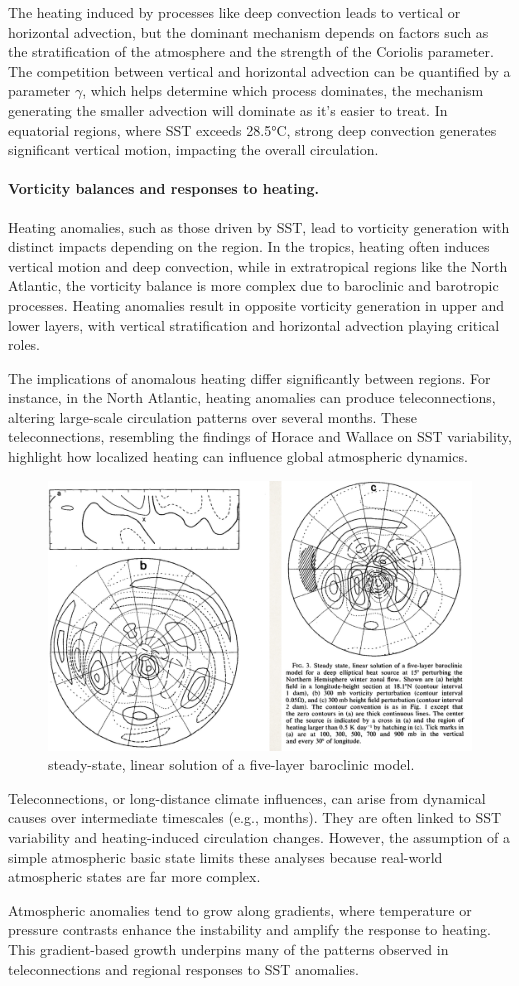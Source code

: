 The heating induced by processes like deep convection leads to vertical or horizontal advection, but the dominant mechanism depends on factors such as the stratification of the atmosphere and the strength of the Coriolis parameter. The competition between vertical and horizontal advection can be quantified by a parameter $\gamma$, which helps determine which process dominates, the mechanism generating the smaller advection will dominate as it's easier to treat. In equatorial regions, where SST exceeds 28.5°C, strong deep convection generates significant vertical motion, impacting the overall circulation.

\paragraph{Vorticity balances and responses to heating.}
Heating anomalies, such as those driven by SST, lead to vorticity generation with distinct impacts depending on the region. In the tropics, heating often induces vertical motion and deep convection, while in extratropical regions like the North Atlantic, the vorticity balance is more complex due to baroclinic and barotropic processes. Heating anomalies result in opposite vorticity generation in upper and lower layers, with vertical stratification and horizontal advection playing critical roles.

The implications of anomalous heating differ significantly between regions. For instance, in the North Atlantic, heating anomalies can produce teleconnections, altering large-scale circulation patterns over several months. These teleconnections, resembling the findings of Horace and Wallace on SST variability, highlight how localized heating can influence global atmospheric dynamics.
\begin{figure}[htp!]
	\centering
	\includegraphics[width=0.4\linewidth]{uploads/Screenshot 2024-11-26 104358.png}
	\caption{steady-state, linear solution of a five-layer baroclinic model.}
	\label{fig:enter-label}
\end{figure}

Teleconnections, or long-distance climate influences, can arise from dynamical causes over intermediate timescales (e.g., months). They are often linked to SST variability and heating-induced circulation changes. However, the assumption of a simple atmospheric basic state limits these analyses because real-world atmospheric states are far more complex.

Atmospheric anomalies tend to grow along gradients, where temperature or pressure contrasts enhance the instability and amplify the response to heating. This gradient-based growth underpins many of the patterns observed in teleconnections and regional responses to SST anomalies.